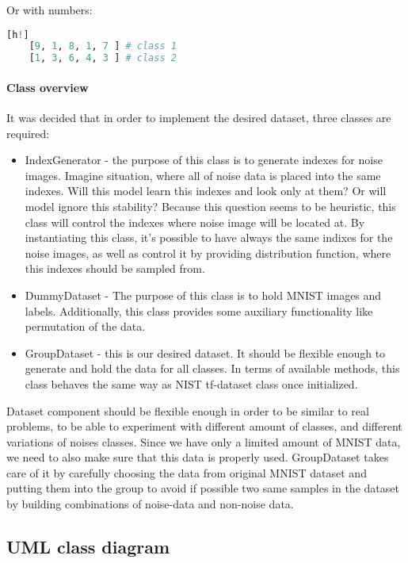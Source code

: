 Or with numbers:
\begin{lstlisting}[language=Python][h!]
	[9, 1, 8, 1, 7 ] # class 1
	[1, 3, 6, 4, 3 ] # class 2
\end{lstlisting}



\paragraph{Class overview}

It was decided that in order to implement
the desired dataset, three classes are required:
\begin{itemize}
	\item IndexGenerator - the purpose of this class is to generate indexes for
		noise images. Imagine situation, where all of noise data is placed into
		the same indexes. Will this model learn this indexes and look only at
		them? Or will model ignore this stability? Because this question seems
		to be heuristic, this class will control the indexes where noise image
		will be located at. By instantiating this class, it's possible to have
		always the same indixes for the noise images, as well as control it by
		providing distribution function, where this indexes should be sampled from.
	\item DummyDataset - The purpose of this class is to hold MNIST images
		and labels. Additionally, this class provides some auxiliary functionality
		like permutation of the data.
	\item GroupDataset - this is our desired dataset. It should be flexible
		enough to generate and hold the data for all classes. In terms of
		available methods, this class behaves the same way as NIST tf-dataset class
		once initialized.
\end{itemize}

Dataset component should be flexible enough in order to be similar to real problems,
to be able to experiment with different amount of classes, and
different variations of noises classes. Since we have only a limited amount of MNIST data,
we need to also make sure that this data is properly used. GroupDataset takes
care of it by carefully choosing the data from original MNIST dataset and putting
them into the group to avoid if possible two same samples in the dataset by building
combinations of noise-data and non-noise data.

\subsection{UML class diagram}

